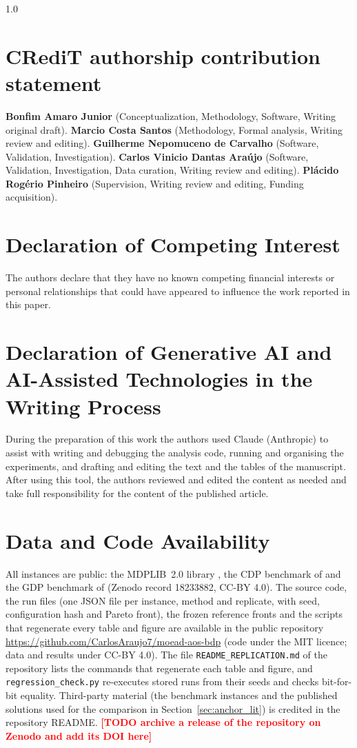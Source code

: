 \documentclass[final,3p,times,11pt,authoryear]{elsarticle}
\theoremstyle{plain}
\theoremstyle{definition}
\theoremstyle{remark}
\newcommand{\todo}[1]{\textcolor{red}{\textbf{[TODO #1]}}}
\begin{document}
\begingroup
\small
\begin{spacing}{1.0}

\section*{CRediT authorship contribution statement}
\textbf{Bonfim Amaro Junior} (Conceptualization, Methodology, Software, Writing original draft).
\textbf{Marcio Costa Santos} (Methodology, Formal analysis, Writing review and editing).
\textbf{Guilherme Nepomuceno de Carvalho} (Software, Validation, Investigation).
\textbf{Carlos Vinicio Dantas Araújo} (Software, Validation, Investigation, Data curation, Writing review and editing).
\textbf{Plácido Rogério Pinheiro} (Supervision, Writing review and editing, Funding acquisition).

\section*{Declaration of Competing Interest}
The authors declare that they have no known competing financial interests or personal relationships that could have appeared to influence the work reported in this paper.

\section*{Declaration of Generative AI and AI-Assisted Technologies in the Writing Process}
During the preparation of this work the authors used Claude (Anthropic) to assist with writing and debugging the analysis code, running and organising the experiments, and drafting and editing the text and the tables of the manuscript. After using this tool, the authors reviewed and edited the content as needed and take full responsibility for the content of the published article.

\section*{Data and Code Availability}
All instances are public: the MDPLIB~2.0 library \citep{marti2021a}, the CDP benchmark of \citet{peiro2021} and the GDP benchmark of \citet{lozanoosorio2022} (Zenodo record 18233882, CC-BY 4.0). The source code, the run files (one JSON file per instance, method and replicate, with seed, configuration hash and Pareto front), the frozen reference fronts and the scripts that regenerate every table and figure are available in the public repository \url{https://github.com/CarlosAraujo7/moead-aos-bdp} (code under the MIT licence; data and results under CC-BY 4.0). The file \texttt{README\_REPLICATION.md} of the repository lists the commands that regenerate each table and figure, and \texttt{regression\_check.py} re-executes stored runs from their seeds and checks bit-for-bit equality. Third-party material (the benchmark instances and the published solutions used for the comparison in Section~\ref{sec:anchor_lit}) is credited in the repository README. \todo{archive a release of the repository on Zenodo and add its DOI here}


\end{spacing}
\end{document}
